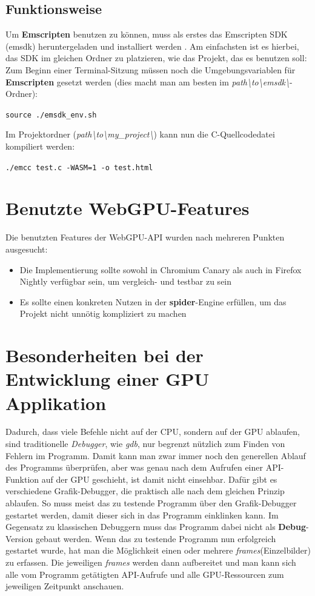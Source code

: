 \documentclass[oneside]{ausarbeitung}
\begin{document}
\subsection{Funktionsweise}
Um \textbf{Emscripten} benutzen zu können, muss als erstes das Emscripten SDK (emsdk) heruntergeladen und installiert werden \cite{emsdk}. Am einfachsten ist es hierbei, das SDK im gleichen Ordner zu platzieren, wie das Projekt, das es benutzen soll:
Zum Beginn einer Terminal-Sitzung müssen noch die Umgebungsvariablen für \textbf{Emscripten} gesetzt werden (dies macht man am besten im \textit{path\textbackslash to\textbackslash emsdk\textbackslash}-Ordner):

\texttt{source ./emsdk\_env.sh}

Im Projektordner (\textit{path\textbackslash to\textbackslash my\_project\textbackslash}) kann nun die C-Quellcodedatei kompiliert werden:

\texttt{./emcc test.c -WASM=1 -o test.html}

\section{Benutzte WebGPU-Features}
Die benutzten Features der \ac{WebGPU}-API wurden nach mehreren Punkten ausgesucht:
\begin{itemize}
\item{Die Implementierung sollte sowohl in Chromium Canary als auch in Firefox Nightly verfügbar sein, um vergleich- und testbar zu sein}
\item{Es sollte einen konkreten Nutzen in der \textbf{spider}-Engine erfüllen, um das Projekt nicht unnötig kompliziert zu machen}
\end{itemize}


\section{Besonderheiten bei der Entwicklung einer GPU Applikation}
Dadurch, dass viele Befehle nicht auf der \ac{CPU}, sondern auf der \ac{GPU} ablaufen, sind traditionelle \textit{Debugger}, wie \textit{gdb}, nur begrenzt nützlich zum Finden von Fehlern im Programm. Damit kann man zwar immer noch den generellen Ablauf des Programms überprüfen, aber was genau nach dem Aufrufen einer \ac{API}-Funktion auf der \ac{GPU} geschieht, ist damit nicht einsehbar. Dafür gibt es verschiedene Grafik-Debugger, die praktisch alle nach dem gleichen Prinzip ablaufen. So muss meist das zu testende Programm über den Grafik-Debugger gestartet werden, damit dieser sich in das Programm einklinken kann. Im Gegensatz zu klassischen Debuggern muss das Programm dabei nicht als \textbf{Debug}-Version gebaut werden. Wenn das zu testende Programm nun erfolgreich gestartet wurde, hat man die Möglichkeit einen oder mehrere \textit{frames}(Einzelbilder) zu erfassen. Die jeweiligen \textit{frames} werden dann aufbereitet und man kann sich alle vom Programm getätigten \ac{API}-Aufrufe und alle \ac{GPU}-Ressourcen zum jeweiligen Zeitpunkt anschauen.
\end{document}
